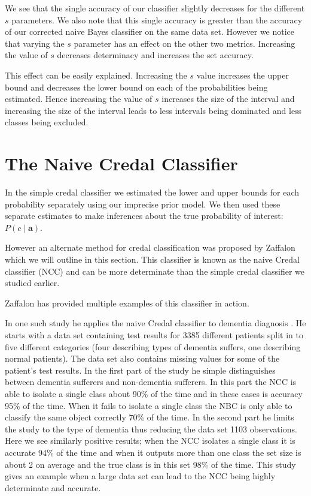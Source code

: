 We see that the single accuracy of our classifier slightly decreases for the different $s$ parameters.
We also note that this single accuracy is greater than the accuracy of our corrected naive Bayes classifier on the same data set.
However we notice that varying the $s$ parameter has an effect on the other two metrics.
Increasing the value of $s$ decreases determinacy and increases the set accuracy.

This effect can be easily explained.
Increasing the $s$ value increases the upper bound and decreases the lower bound on each of the probabilities being estimated.
Hence increasing the value of $s$ increases the size of the interval and increasing the size of the interval leads to less intervals being dominated and less classes being excluded.

\section{The Naive Credal Classifier}
In the simple credal classifier we estimated the lower and upper bounds for each probability separately using our imprecise prior model.
We then used these separate estimates to make inferences about the true probability of interest: $P(c \mid \mathbf{a})$.

However an alternate method for credal classification was proposed by Zaffalon \cite{Zaffalon01} which we will outline in this section.
This classifier is known as the naive Credal classifier (NCC) and can be more determinate than the simple credal classifier we studied earlier.

Zaffalon has provided multiple examples of this classifier in action.

In one such study he applies the naive Credal classifier to dementia diagnosis \cite{Zaffalon03}.
He starts with a data set containing test results for 3385 different patients split in to five different categories (four describing types of dementia suffers, one describing normal patients).
The data set also contains missing values for some of the patient's test results.
In the first part of the study he simple distinguishes between dementia sufferers and non-dementia sufferers.
In this part the NCC is able to isolate a single class about 90\% of the time and in these cases is accuracy 95\% of the time.
When it fails to isolate a single class the NBC is only able to classify the same object correctly 70\% of the time.
In the second part he limits the study to the type of dementia thus reducing the data set  1103 observations.
Here we see similarly positive results; when the NCC isolates a single class it is accurate 94\% of the time and when it outputs more than one class the set size is about 2 on average and the true class is in this set 98\% of the time.
This study gives an example when a large data set can lead to the NCC being highly determinate and accurate.

